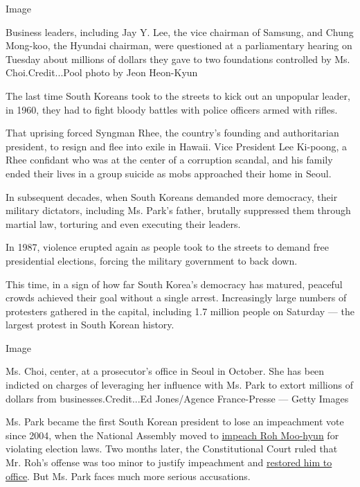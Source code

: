 Image

Business leaders, including Jay Y. Lee, the vice chairman of Samsung,
and Chung Mong-koo, the Hyundai chairman, were questioned at a
parliamentary hearing on Tuesday about millions of dollars they gave to
two foundations controlled by Ms. Choi.Credit...Pool photo by Jeon
Heon-Kyun

The last time South Koreans took to the streets to kick out an unpopular
leader, in 1960, they had to fight bloody battles with police officers
armed with rifles.

That uprising forced Syngman Rhee, the country's founding and
authoritarian president, to resign and flee into exile in Hawaii. Vice
President Lee Ki-poong, a Rhee confidant who was at the center of a
corruption scandal, and his family ended their lives in a group suicide
as mobs approached their home in Seoul.

In subsequent decades, when South Koreans demanded more democracy, their
military dictators, including Ms. Park's father, brutally suppressed
them through martial law, torturing and even executing their leaders.

In 1987, violence erupted again as people took to the streets to demand
free presidential elections, forcing the military government to back
down.

This time, in a sign of how far South Korea's democracy has matured,
peaceful crowds achieved their goal without a single arrest.
Increasingly large numbers of protesters gathered in the capital,
including 1.7 million people on Saturday --- the largest protest in
South Korean history.

Image

Ms. Choi, center, at a prosecutor's office in Seoul in October. She has
been indicted on charges of leveraging her influence with Ms. Park to
extort millions of dollars from businesses.Credit...Ed Jones/Agence
France-Presse --- Getty Images

Ms. Park became the first South Korean president to lose an impeachment
vote since 2004, when the National Assembly moved to
\href{http://www.nytimes3xbfgragh.onion/2004/03/13/world/president-s-impeachment-stirs-angry-protests-in-south-korea.html}{impeach
Roh Moo-hyun} for violating election laws. Two months later, the
Constitutional Court ruled that Mr. Roh's offense was too minor to
justify impeachment and
\href{http://www.nytimes3xbfgragh.onion/2004/05/14/world/constitutional-court-reinstates-south-korea-s-impeached-president.html}{restored
him to office}. But Ms. Park faces much more serious accusations.

